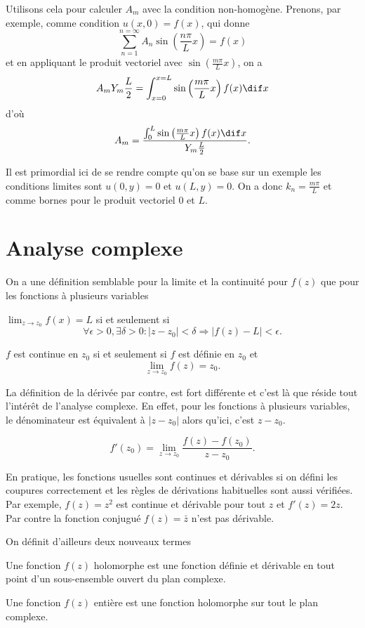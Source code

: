 Utilisons cela pour calculer $A_m$ avec la condition non-homogène.
Prenons, par exemple, comme condition $u(x, 0) = f(x)$, qui donne
\[ \sum_{n = 1}^{n = \infty} A_n \sin\left(\frac{n\pi}{L} x\right)
= f(x) \]
et en appliquant le produit vectoriel avec
$\sin\left(\frac{m\pi}{L} x\right)$, on a
\[ A_mY_m\frac{L}{2} =
\int_{x=0}^{x=L} \sin\left(\frac{m\pi}{L}x\right) f(x) \dif x \]
d'où
\[ A_m = \frac{
\int_{0}^{L} \sin\left(\frac{m\pi}{L}x\right) f(x) \dif x}
{Y_m\frac{L}{2}}. \]
\begin{myrem}
  Il est primordial ici de se rendre compte qu'on se base sur un
  exemple les conditions limites sont $u(0, y) = 0$ et $u(L, y) = 0$.
  On a donc $k_n = \frac{m\pi}{L}$ et comme bornes pour le produit
  vectoriel 0 et $L$.
\end{myrem}

\part{Analyse complexe}
On a une définition semblable pour la limite et la continuité
pour $f(z)$ que pour les fonctions à plusieurs variables
\begin{mydef}[Limite]
  $\lim_{z\to z_0} f(x) = L$ si et seulement si
  \[ \forall \epsilon>0, \exists\delta>0:
  |z-z_0|<\delta \Rightarrow |f(z)-L|<\epsilon. \]
\end{mydef}
\begin{mydef}[Continuité]
  $f$ est continue en $z_0$ si et seulement si $f$ est définie en $z_0$ et
  \[ \lim_{z \to z_0} f(z) = z_0. \]
\end{mydef}

La définition de la dérivée par contre, est fort différente
et c'est là que réside tout l'intérêt de l'analyse complexe.
En effet, pour les fonctions à plusieurs variables, le dénominateur est
équivalent à $|z - z_0|$ alors qu'ici, c'est $z - z_0$.
\begin{mydef}
  \[ f'(z_0) = \lim_{z \to z_0} \frac{f(z) - f(z_0)}{z - z_0}. \]
\end{mydef}

En pratique, les fonctions usuelles sont continues et dérivables si
on défini les coupures correctement et les règles de dérivations
habituelles sont aussi vérifiées.
Par exemple, $f(z) = z^2$ est continue et dérivable pour tout $z$ et
$f'(z) = 2z$.
Par contre la fonction conjugué $f(z) = \bar{z}$ n'est pas dérivable.

On définit d'ailleurs deux nouveaux termes
\begin{mydef}
  Une fonction $f(z)$ holomorphe est une fonction définie et dérivable
  en tout point d'un sous-ensemble ouvert du plan complexe.
\end{mydef}
\begin{mydef}
  Une fonction $f(z)$ entière est une fonction holomorphe sur tout
  le plan complexe.
\end{mydef}

